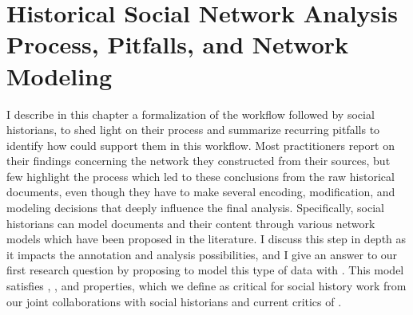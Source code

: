 \chapter{Historical Social Network Analysis Process, Pitfalls, and Network Modeling}\label{ch:hsna-process-and-network-modeling}
\minitoc

I describe in this chapter a formalization of the \hsna workflow followed by social historians, to shed light on their process and summarize recurring pitfalls to identify how \va could support them in this workflow.
Most \hsna practitioners report on their findings concerning the network they constructed from their sources, but few highlight the process which led to these conclusions from the raw historical documents, even though they have to make several encoding, modification, and modeling decisions that deeply influence the final analysis\cite{alkadi2022}.
Specifically, social historians can model documents and their content through various network models which have been proposed in the literature.
I discuss this step in depth as it impacts the annotation and analysis possibilities, and I give an answer to our first research question \qone by proposing to model this type of data with \modelplural.
This model satisfies \simplicity, \reality, and \traceability properties, which we define as critical for social history work from our joint collaborations with social historians and current critics of \hsna \cite{lemercier12FormalNetwork2015, lemercierBackSourcesPracticing2021, edelsteinHistoricalResearchDigital2017}.


